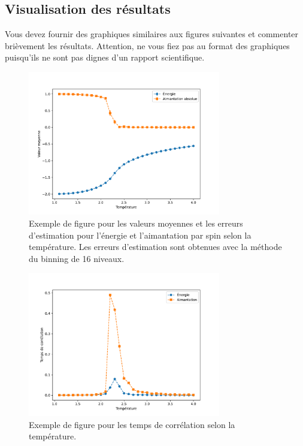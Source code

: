 \documentclass[12pt, letterpaper]{article}
\numberwithin{table}{section}
\numberwithin{figure}{section}
\numberwithin{equation}{section}
\begin{document}
\subsection{Visualisation des résultats}\label{subsec:visualisation-des-resultats}

\noindent Vous devez fournir des graphiques similaires aux figures suivantes
et commenter brièvement les résultats.
Attention, ne vous fiez pas au format des graphiques puisqu'ils ne sont pas dignes d'un rapport scientifique.

\begin{figure}[H]
    \begin{center}
        \includegraphics[width=0.75\textwidth]{../images/energie_aimantation}
    \end{center}
    \caption{
        Exemple de figure pour les valeurs moyennes et les erreurs d'estimation
        pour l'énergie et l'aimantation par spin selon la température.
        Les erreurs d'estimation sont obtenues avec la méthode du binning de 16 niveaux.
    }
    \label{fig:moyennes}
\end{figure}

\begin{figure}[H]
    \begin{center}
        \includegraphics[width=0.75\textwidth]{../images/temps_correlation}
    \end{center}
    \caption{
        Exemple de figure pour les temps de corrélation selon la température.
    }
    \label{fig:correlation}
\end{figure}
\end{document}
